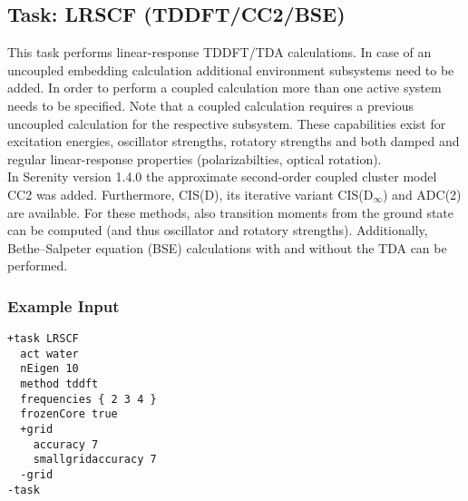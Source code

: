 \subsection{Task: LRSCF (TDDFT/CC2/BSE)}
This task performs linear-response TDDFT/TDA calculations. In case of an uncoupled embedding calculation additional environment subsystems need to be added. In order to perform a coupled calculation more than one active system needs to be specified. Note that a coupled calculation requires a previous uncoupled calculation for the respective subsystem. These capabilities exist for excitation energies, oscillator strengths, rotatory strengths and both damped and regular linear-response properties (polarizabilties, optical rotation).\\

\noindent
In Serenity version 1.4.0 the approximate second-order coupled cluster model CC2 was added. Furthermore, CIS(D), its iterative variant CIS(D$_\infty$) and
ADC(2) are available. For these methods, also transition moments from the ground state can be computed (and thus oscillator and rotatory strengths).
Additionally, Bethe--Salpeter equation (BSE) calculations with and without the TDA can be performed.

\subsubsection{Example Input}
\begin{lstlisting}
+task LRSCF
  act water
  nEigen 10
  method tddft
  frequencies { 2 3 4 }
  frozenCore true
  +grid
    accuracy 7
    smallgridaccuracy 7
  -grid
-task
\end{lstlisting}
